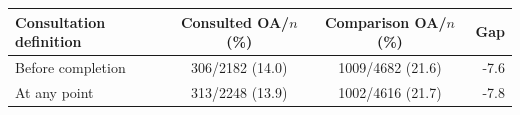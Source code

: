 \begin{tabular}{l cc r}
\toprule
Consultation definition & Consulted OA/$n$ (\%) & Comparison OA/$n$ (\%) & Gap \\
\midrule
Before completion & 306/2182 (14.0) & 1009/4682 (21.6) & -7.6 \\
At any point & 313/2248 (13.9) & 1002/4616 (21.7) & -7.8 \\
\bottomrule
\end{tabular}